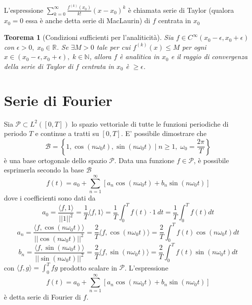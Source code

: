 \documentclass{article}
\newtheorem{theorem}{Teorema}
\begin{document}
        L'espressione $\displaystyle \sum_{k = 0}^{\infty} \frac{f^{(k)}(x_{0})}{k!}(x - x_{0})^{k}$ è chiamata serie di Taylor (qualora $x_{0} = 0$ essa è anche detta serie di MacLaurin) di $f$ centrata in $x_{0}$

        \vspace{10pt}
        \begin{theorem}[Condizioni sufficienti per l'analiticità]
            Sia $f \in C^{\infty}(x_{0} - \epsilon, x_{0} + \epsilon)$ con $\epsilon > 0, \; x_{0} \in \mathbb{R}$.
            Se $\exists M > 0$ tale per cui $f^{(k)}(x) \leq M$ per ogni $x \in (x_{0} - \epsilon, x_{0} + \epsilon), \; k \in \mathbb{N}$, allora $f$ è analitica in $x_{0}$ e il raggio di convergenza della serie di Taylor di $f$ centrata in $x_{0}$ è $\geq \epsilon$.
        \end{theorem}

            

    \newpage
    \section{Serie di Fourier}
    Sia $\mathcal{P} \subset L^{2}([0, T])$ lo spazio vettoriale di tutte le funzioni periodiche di periodo $T$ e continue a tratti su $[0, T]$.
    E' possibile dimostrare che
    \[
        \mathcal{B} = \left\{ \left. 1, \cos(n\omega_{0}t), \sin(n \omega_{0} t) \;  \right| \; n \geq 1, \; \omega_{0} = \frac{2\pi}{T} \right\}
    \]
    è una base ortogonale dello spazio $\mathcal{P}$.
    Data una funzione $f \in \mathcal{P}$, è possibile esprimerla secondo la base $\mathcal{B}$
    \[
        f(t) = a_{0} + \sum_{n = 1}^{\infty} \left[ a_{n}\cos(n \omega_{0} t) + b_{n}\sin(n \omega_{0} t) \right]
    \]
    dove i coefficienti sono dati da
    \[
        a_{0} = \frac{\langle f, 1\rangle}{||1||^{2}} = \frac{1}{T} \langle f, 1 \rangle = \frac{1}{T} \int_{0}^{T} f(t) \cdot 1 \: dt = \frac{1}{T} \int_{0}^{T} f(t) dt
    \]
    \[
        a_{n} = \frac{\langle f, \cos(n \omega_{0} t) \rangle}{||\cos(n \omega_{0} t)||^{2}} = \frac{2}{T} \langle f, \cos(n \omega_{0} t) \rangle = \frac{2}{T} \int_{0}^{T} f(t)\cos(n \omega_{0} t) dt
    \]
    \[
        b_{n} = \frac{\langle f, \sin(n \omega_{0} t) \rangle}{||\sin(n \omega_{0} t)||^{2}} = \frac{2}{T} \langle f, \sin(n \omega_{0} t) \rangle = \frac{2}{T} \int_{0}^{T} f(t)\sin(n \omega_{0} t) dt
    \]
    con $\langle f, g \rangle = \int_{0}^{T}fg$ prodotto scalare in $\mathcal{P}$.
    L'espressione 
    \[
        f(t) = a_{0} + \sum_{n = 1}^{\infty} \left[ a_{n}\cos(n \omega_{0} t) + b_{n}\sin(n \omega_{0} t) \right]
    \]
    è detta serie di Fourier di $f$.
\end{document}
